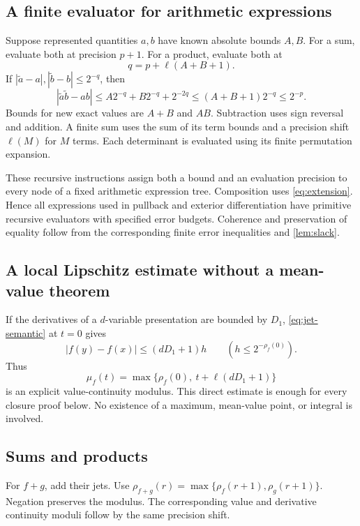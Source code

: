 \subsection{A finite evaluator for arithmetic expressions}

Suppose represented quantities $a,b$ have known absolute bounds $A,B$.
For a sum, evaluate both at precision $p+1$. For a product, evaluate both
at
\[
 q=p+\ell(A+B+1).
\]
If $|\widetilde a-a|,|\widetilde b-b|\le2^{-q}$, then
\[
 |\widetilde a\widetilde b-ab|
 \le A2^{-q}+B2^{-q}+2^{-2q}
 \le(A+B+1)2^{-q}\le2^{-p}.
\]
Bounds for new exact values are $A+B$ and $AB$. Subtraction uses sign
reversal and addition. A finite sum uses the sum of its term bounds and
a precision shift $\ell(M)$ for $M$ terms. Each determinant is evaluated
using its finite permutation expansion.

These recursive instructions assign both a bound and an evaluation
precision to every node of a fixed arithmetic expression tree. Composition
uses \eqref{eq:extension}. Hence all expressions used in pullback and
exterior differentiation have primitive recursive evaluators with
specified error budgets. Coherence and preservation of equality follow
from the corresponding finite error inequalities and
\cref{lem:slack}.

\subsection{A local Lipschitz estimate without a mean-value theorem}

If the derivatives of a $d$-variable presentation are bounded by $D_1$,
\eqref{eq:jet-semantic} at $t=0$ gives
\begin{equation}\label{eq:local-lip}
 |f(y)-f(x)|\le(dD_1+1)h
 \qquad(h\le2^{-\rho_f(0)}).
\end{equation}
Thus
\[
 \mu_f(t)=\max\{\rho_f(0),\ t+\ell(dD_1+1)\}
\]
is an explicit value-continuity modulus. This direct estimate is enough
for every closure proof below. No existence of a maximum, mean-value
point, or integral is involved.

\subsection{Sums and products}\label{sec:product}

For $f+g$, add their jets. Use
$\rho_{f+g}(r)=\max\{\rho_f(r+1),\rho_g(r+1)\}$.
Negation preserves the modulus. The corresponding value and derivative
continuity moduli follow by the same precision shift.

